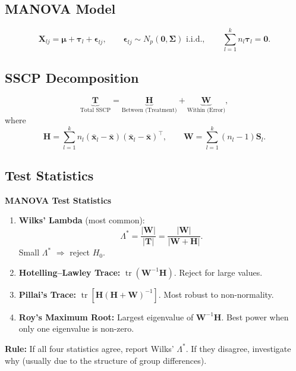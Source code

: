 \documentclass[12pt, a4paper]{article}
\newcommand{\muv}{\boldsymbol{\mu}}
\newcommand{\Sig}{\boldsymbol{\Sigma}}
\newcommand{\tauv}{\boldsymbol{\tau}}
\newcommand{\epsilonv}{\boldsymbol{\epsilon}}
\newcommand{\Np}{N_p}
\begin{document}
\subsection{MANOVA Model}

\[
  \mathbf{X}_{lj} = \muv + \tauv_l + \epsilonv_{lj}, \qquad
  \epsilonv_{lj} \sim \Np(\mathbf{0}, \Sig) \text{ i.i.d.},
  \qquad \sum_{l=1}^k n_l \tauv_l = \mathbf{0}.
\]

\subsection{SSCP Decomposition}

\[
  \underbrace{\mathbf{T}}_{\text{Total SSCP}} = \underbrace{\mathbf{H}}_{\text{Between (Treatment)}} + \underbrace{\mathbf{W}}_{\text{Within (Error)}},
\]
where
\[
  \mathbf{H} = \sum_{l=1}^k n_l (\bar{\mathbf{x}}_l - \bar{\mathbf{x}})(\bar{\mathbf{x}}_l - \bar{\mathbf{x}})^{\top}, \qquad
  \mathbf{W} = \sum_{l=1}^k (n_l - 1)\mathbf{S}_l.
\]

\subsection{Test Statistics}

\begin{keybox}\noindent\textbf{MANOVA Test Statistics}\par\smallskip
\begin{enumerate}[label=\arabic*.]
  \item \textbf{Wilks' Lambda} (most common):
        \[ \Lambda^* = \frac{|\mathbf{W}|}{|\mathbf{T}|} = \frac{|\mathbf{W}|}{|\mathbf{W}+\mathbf{H}|}. \]
        Small $\Lambda^*$ $\Rightarrow$ reject $H_0$.
  \item \textbf{Hotelling--Lawley Trace:} $\operatorname{tr}(\mathbf{W}^{-1}\mathbf{H})$. Reject for large values.
  \item \textbf{Pillai's Trace:} $\operatorname{tr}\!\left[\mathbf{H}(\mathbf{H}+\mathbf{W})^{-1}\right]$. Most robust to non-normality.
  \item \textbf{Roy's Maximum Root:} Largest eigenvalue of $\mathbf{W}^{-1}\mathbf{H}$. Best power when only one eigenvalue is non-zero.
\end{enumerate}
\end{keybox}

\textbf{Rule:} If all four statistics agree, report Wilks' $\Lambda^*$. If they disagree, investigate why (usually due to the structure of group differences).
\end{document}

